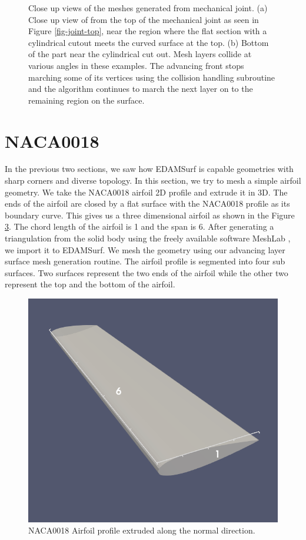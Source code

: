 \begin{figure}
\begin{subfigure}{.5\textwidth}
		\caption{}
		\label{closeUp2}
	\end{subfigure}
	\caption{Close up views of the meshes generated from mechanical joint. (a) Close up view of from the top of the mechanical joint as seen in Figure \ref{fig-joint-top}, near the region where the flat section with a cylindrical cutout meets the curved surface at the top. (b) Bottom of the part near the cylindrical cut out. Mesh layers collide at various angles in these examples. The advancing front stops marching some of its vertices using the collision handling subroutine and the algorithm continues to march the next layer on to the remaining region on the surface.}
	\label{fig-closeUp}
\end{figure}

\section{NACA0018}

In the previous two sections, we saw how EDAMSurf is capable geometries with sharp corners and diverse topology. In this section, we try to mesh a simple airfoil geometry. We take the NACA0018 airfoil 2D profile and extrude it in 3D. The ends of the airfoil are closed by a flat surface with the NACA0018 profile as its boundary curve. This gives us a three dimensional airfoil as shown in the Figure \ref{fig-naca0018}. The chord length of the airfoil is 1 and the span is 6. After generating a triangulation from the solid body using the freely available software MeshLab \cite{LocalChapterEvents:ItalChap:ItalianChapConf2008:129-136}, we import it to EDAMSurf. We mesh the geometry using our advancing layer surface mesh generation routine. The airfoil profile is segmented into four sub surfaces. Two surfaces represent the two ends of the airfoil while the other two represent the top and the bottom of the airfoil.

\begin{figure}
	\centering
	\includegraphics[width=0.6\linewidth]{img/r/naca0018.png}
	\caption{NACA0018 Airfoil profile extruded along the normal direction.}
	\label{fig-naca0018}
\end{figure}

